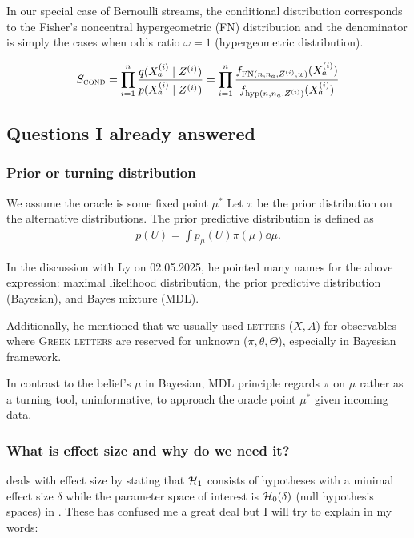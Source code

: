 In our special case of Bernoulli streams, the conditional distribution corresponds to
the Fisher's noncentral hypergeometric (FN) distribution and the denominator is
simply the cases when odds ratio $\omega = 1$ (hypergeometric distribution).

\begin{align*}
	S_{\textsc{\tiny COND}} = \prod_{i=1}^n \frac{q(X_a^{(i)}\mid Z^{(i)})}{p(X_a^{(i)}\mid Z^{(i)})}
	= \prod_{i=1}^n \frac{f_{\textrm{FN}(n,n_a,Z^{(i)},w)}(X_a^{(i)})}{f_{\textrm{hyp}(n,n_a,Z^{(i)})}(X_a^{(i)})}
\end{align*}

\clearpage

\subsection{Questions I already answered}

\subsubsection{Prior or turning distribution}

We assume the oracle is some fixed point $\mu^*$
Let $\pi$ be the prior distribution on the alternative distributions.
The prior predictive distribution is defined as
\begin{align*}
	p(U) = \int p_{\mu}(U) \pi(\mu) \dd{\mu}.
\end{align*}

In the discussion with Ly on 02.05.2025, he pointed many names for
the above expression:
maximal likelihood distribution, the prior predictive distribution (Bayesian), and Bayes mixture (MDL).

Additionally, he mentioned that we usually used \textsc{letters} ($X,A$) for
observables where \textsc{Greek letters} are reserved for unknown
($\pi, \theta, \Theta$), especially in Bayesian framework.

In contrast to the belief's $\mu$ in Bayesian, MDL principle
regards $\pi$ on $\mu$ rather as a turning tool, uninformative,
to approach the oracle point $\mu^*$ given incoming data.

\subsubsection{What is effect size and why do we need it?}
\cite{turnerGenericEvariablesExact2024} deals with effect size by stating that $\mathcal{H}_1$ consists of hypotheses with a minimal effect size $\delta$ while the parameter space of interest is $\mathcal{H}_0(\delta)$ (null hypothesis spaces) in \cite{turnerExactAnytimevalidConfidence2023}. These has confused me a great deal but I will try to explain in my words:

